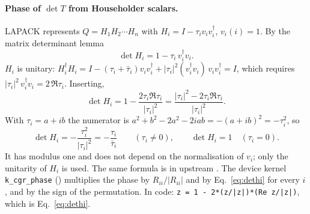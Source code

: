 \paragraph{Phase of $\det T$ from Householder scalars.} LAPACK represents $Q=H_1H_2\cdots H_n$ with $H_i=I-\tau_iv_iv_i^\dagger$, $v_i(i)=1$. By the matrix determinant lemma
\begin{equation}
\det H_i = 1-\tau_i\,v_i^\dagger v_i .
\end{equation}
$H_i$ is unitary: $H_i^\dagger H_i = I-(\tau_i+\bar\tau_i)v_iv_i^\dagger+|\tau_i|^2(v_i^\dagger v_i)\,v_iv_i^\dagger = I$, which requires $|\tau_i|^2\,v_i^\dagger v_i = 2\,\Re\tau_i$. Inserting,
\begin{equation}
\det H_i = 1-\frac{2\tau_i\Re\tau_i}{|\tau_i|^2} = \frac{|\tau_i|^2-2\tau_i\Re\tau_i}{|\tau_i|^2}.
\end{equation}
With $\tau_i=a+ib$ the numerator is $a^2+b^2-2a^2-2iab=-(a+ib)^2=-\tau_i^2$, so
\begin{equation}
\label{eq:dethi}
\det H_i = -\frac{\tau_i^2}{|\tau_i|^2} = -\frac{\tau_i}{\bar\tau_i}\qquad(\tau_i\ne0),\qquad \det H_i=1\quad(\tau_i=0).
\end{equation}
It has modulus one and does not depend on the normalisation of $v_i$; only the unitarity of $H_i$ is used. The same formula is in upstream . The device kernel \texttt{k\_cgr\_phase} () multiplies the phase by $R_{ii}/|R_{ii}|$ and by Eq.~\eqref{eq:dethi} for every $i$, and by the sign of the permutation. In code: \texttt{z = 1 - 2*(z/|z|)*(Re z/|z|)}, which is Eq.~\eqref{eq:dethi}.

